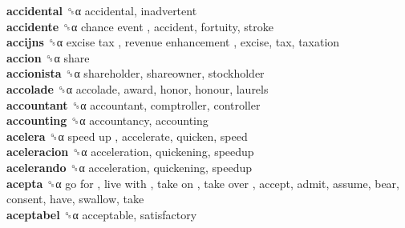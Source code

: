 \textbf{accidental} ␝α  accidental, inadvertent  \\
\textbf{accidente} ␝α   chance event , accident, fortuity, stroke  \\
\textbf{accijns} ␝α   excise tax ,  revenue enhancement , excise, tax, taxation  \\
\textbf{accion} ␝α  share  \\
\textbf{accionista} ␝α  shareholder, shareowner, stockholder  \\
\textbf{accolade} ␝α  accolade, award, honor, honour, laurels  \\
\textbf{accountant} ␝α  accountant, comptroller, controller  \\
\textbf{accounting} ␝α  accountancy, accounting  \\
\textbf{acelera} ␝α   speed up , accelerate, quicken, speed  \\
\textbf{aceleracion} ␝α  acceleration, quickening, speedup  \\
\textbf{acelerando} ␝α  acceleration, quickening, speedup  \\
\textbf{acepta} ␝α   go for ,  live with ,  take on ,  take over , accept, admit, assume, bear, consent, have, swallow, take  \\
\textbf{aceptabel} ␝α  acceptable, satisfactory  \\
